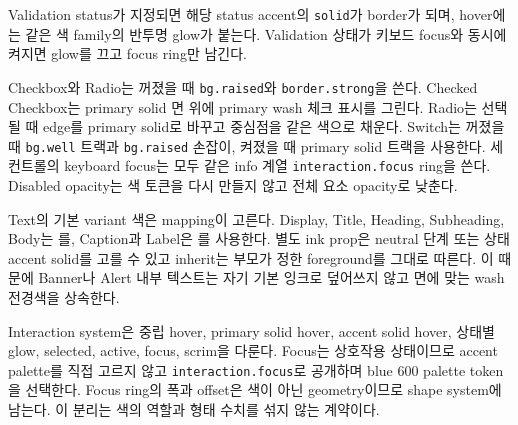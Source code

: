 \documentclass[11pt,titlepage]{article}
\begin{document}
Validation status가 지정되면 해당 status accent의 \texttt{solid}가 border가 되며, hover에는 같은 색 family의 반투명 glow가 붙는다. Validation 상태가 키보드 focus와 동시에 켜지면 glow를 끄고 focus ring만 남긴다.

Checkbox와 Radio는 꺼졌을 때 \texttt{bg.raised}와 \texttt{border.strong}을 쓴다. Checked Checkbox는 primary solid 면 위에 primary wash 체크 표시를 그린다. Radio는 선택될 때 edge를 primary solid로 바꾸고 중심점을 같은 색으로 채운다. Switch는 꺼졌을 때 \texttt{bg.well} 트랙과 \texttt{bg.raised} 손잡이, 켜졌을 때 primary solid 트랙을 사용한다. 세 컨트롤의 keyboard focus는 모두 같은 info 계열 \texttt{interaction.focus} ring을 쓴다. Disabled opacity는 색 토큰을 다시 만들지 않고 전체 요소 opacity로 낮춘다.

Text의 기본 variant 색은  mapping이 고른다. Display, Title, Heading, Subheading, Body는 를, Caption과 Label은 를 사용한다. 별도 ink prop은 neutral 단계 또는 상태 accent solid를 고를 수 있고 inherit는 부모가 정한 foreground를 그대로 따른다. 이 때문에 Banner나 Alert 내부 텍스트는 자기 기본 잉크로 덮어쓰지 않고 면에 맞는 wash 전경색을 상속한다.

Interaction system은 중립 hover, primary solid hover, accent solid hover, 상태별 glow, selected, active, focus, scrim을 다룬다. Focus는 상호작용 상태이므로 accent palette를 직접 고르지 않고 \texttt{interaction.focus}로 공개하며 blue 600 palette token을 선택한다. Focus ring의 폭과 offset은 색이 아닌 geometry이므로 shape system에 남는다. 이 분리는 색의 역할과 형태 수치를 섞지 않는 계약이다\cite{architecture,semantics}.
\end{document}
